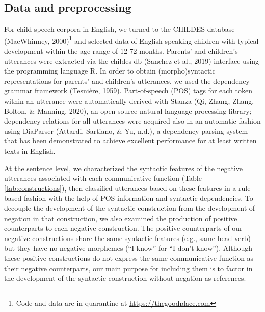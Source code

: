 \documentclass[
  english,
  man,floatsintext]{apa6}
\begin{document}
\hypertarget{data-and-preprocessing}{%
\subsection{Data and preprocessing}\label{data-and-preprocessing}}

For child speech corpora in English, we turned to the CHILDES database (MacWhinney, 2000)\footnote{Code and data are in quarantine at \url{https://thegoodplace.com}} and selected data of English speaking children with typical development within the age range of 12-72 months. Parents' and children's utterances were extracted via the childes-db (Sanchez et al., 2019) interface using the programming language R. In order to obtain (morpho)syntactic representations for parents' and children's utterances, we used the dependency grammar framework (Tesnière, 1959). Part-of-speech (POS) tags for each token within an utterance were automatically derived with Stanza (Qi, Zhang, Zhang, Bolton, \& Manning, 2020), an open-source natural language processing library; dependency relations for all utterances were acquired also in an automatic fashion using DiaParser (Attardi, Sartiano, \& Yu, n.d.), a dependency parsing system that has been demonstrated to achieve excellent performance for at least written texts in English.

At the sentence level, we characterized the syntactic features of the negative utterances associated with each communicative function (Table \ref{tab:constructions}), then classified utterances based on these features in a rule-based fashion with the help of POS information and syntactic dependencies. To decouple the development of the syntactic construction from the development of negation in that construction, we also examined the production of positive counterparts to each negative construction. The positive counterparts of our negative constructions share the same syntactic features (e.g., same head verb) but they have no negative morphemes (``I know'' for ``I don't know''). Although these positive constructions do not express the same communicative function as their negative counterparts, our main purpose for including them is to factor in the development of the syntactic construction without negation as references.
\end{document}
